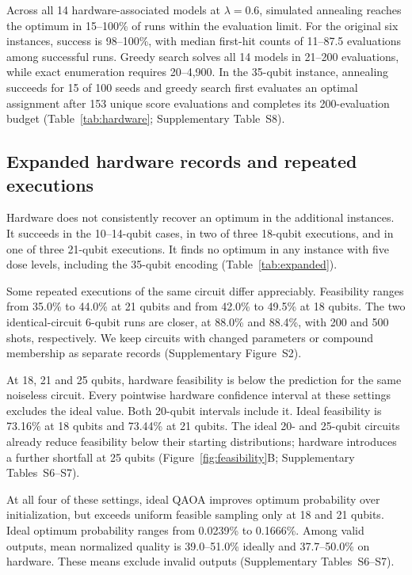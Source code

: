 \documentclass[utf8]{FrontiersinHarvard}
\begin{document}
Across all 14 hardware-associated models at $\lambda=0.6$, simulated annealing reaches the optimum in 15--100\% of runs within the evaluation limit. For the original six instances, success is 98--100\%, with median first-hit counts of 11--87.5 evaluations among successful runs. Greedy search solves all 14 models in 21--200 evaluations, while exact enumeration requires 20--4,900. In the 35-qubit instance, annealing succeeds for 15 of 100 seeds and greedy search first evaluates an optimal assignment after 153 unique score evaluations and completes its 200-evaluation budget (Table~\ref{tab:hardware}; Supplementary Table~S8).

\subsection{Expanded hardware records and repeated executions}
Hardware does not consistently recover an optimum in the additional instances. It succeeds in the 10--14-qubit cases, in two of three 18-qubit executions, and in one of three 21-qubit executions. It finds no optimum in any instance with five dose levels, including the 35-qubit encoding (Table~\ref{tab:expanded}).

Some repeated executions of the same circuit differ appreciably. Feasibility ranges from 35.0\% to 44.0\% at 21 qubits and from 42.0\% to 49.5\% at 18 qubits. The two identical-circuit 6-qubit runs are closer, at 88.0\% and 88.4\%, with 200 and 500 shots, respectively. We keep circuits with changed parameters or compound membership as separate records (Supplementary Figure~S2).

At 18, 21 and 25 qubits, hardware feasibility is below the prediction for the same noiseless circuit. Every pointwise hardware confidence interval at these settings excludes the ideal value. Both 20-qubit intervals include it. Ideal feasibility is 73.16\% at 18 qubits and 73.44\% at 21 qubits. The ideal 20- and 25-qubit circuits already reduce feasibility below their starting distributions; hardware introduces a further shortfall at 25 qubits (Figure~\ref{fig:feasibility}B; Supplementary Tables~S6--S7).

At all four of these settings, ideal QAOA improves optimum probability over initialization, but exceeds uniform feasible sampling only at 18 and 21 qubits. Ideal optimum probability ranges from 0.0239\% to 0.1666\%. Among valid outputs, mean normalized quality is 39.0--51.0\% ideally and 37.7--50.0\% on hardware. These means exclude invalid outputs (Supplementary Tables~S6--S7).
\end{document}
